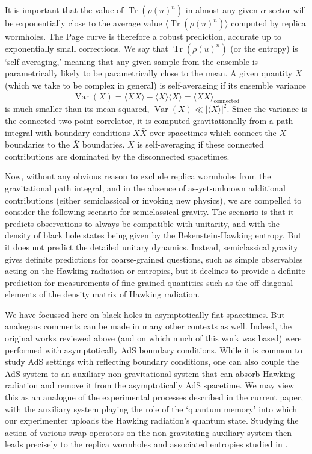 \documentclass[letterpaper,12pt]{article}
\DeclareMathOperator{\Tr}{Tr}
\begin{document}
It is important that the value of $\Tr(\rho(u)^n)$ in almost any given $\alpha$-sector will be exponentially close to the average value $\big\langle \Tr(\rho(u)^n)\big\rangle$ computed by replica wormholes.  The Page curve is therefore a robust prediction, accurate up to exponentially small corrections. We say that $\Tr(\rho(u)^n)$ (or the entropy) is `self-averaging,' meaning that any given sample from the ensemble is parametrically likely to be parametrically close to the mean. A given quantity $X$ (which we take to be complex in general) is self-averaging if its ensemble variance
\begin{equation}
	\operatorname{Var}(X) =\big\langle X\bar{X} \big\rangle - \big\langle X\big\rangle\big\langle\bar{X} \big\rangle = \big\langle X\bar{X} \big\rangle_\mathrm{connected}
\end{equation}
is much smaller than its mean squared, $\operatorname{Var}(X) \ll \left|\big\langle X\big\rangle\right|^2$. Since the variance is the connected two-point correlator, it is computed gravitationally from a path integral with boundary conditions $X\bar{X}$ over spacetimes which connect the $X$ boundaries to the $\bar{X}$ boundaries. $X$ is self-averaging if these connected contributions are dominated by the disconnected spacetimes.

Now, without any obvious reason to exclude replica wormholes from the gravitational path integral, and in the absence of as-yet-unknown additional contributions (either semiclassical or invoking new physics), we are compelled to consider the following scenario for semiclassical gravity. The scenario is that it predicts observations to always be compatible with unitarity, and with the density of black hole states being given by the Bekenstein-Hawking entropy. But it does not predict the detailed unitary dynamics. Instead, semiclassical gravity gives definite predictions for coarse-grained questions, such as simple observables acting on the Hawking radiation or entropies, but it declines to provide a definite prediction for measurements of fine-grained quantities such as the off-diagonal elements of the density matrix of Hawking radiation.

We have focussed here on black holes in asymptotically flat spacetimes.  But analogous comments can be made in many other contexts as well.  Indeed, the original works \cite{Penington:2019npb,Almheiri:2019psf,Penington:2019kki,Almheiri:2019qdq,Marolf:2020xie} reviewed above (and on which much of this work was based) were performed with asymptotically AdS boundary conditions.  While it is common to study AdS settings with reflecting boundary conditions, one can also couple the AdS system to an auxiliary non-gravitational system that can absorb Hawking radiation and remove it from the asymptotically AdS spacetime.  We may view this as an analogue of the experimental processes described in the current paper, with the auxiliary system playing the role of the `quantum memory' into which our experimenter uploads the Hawking radiation's quantum state.  Studying the action of various swap operators on the non-gravitating auxiliary system then leads precisely to the replica wormholes and associated entropies studied in \cite{Penington:2019kki,Almheiri:2019qdq}.
\end{document}
